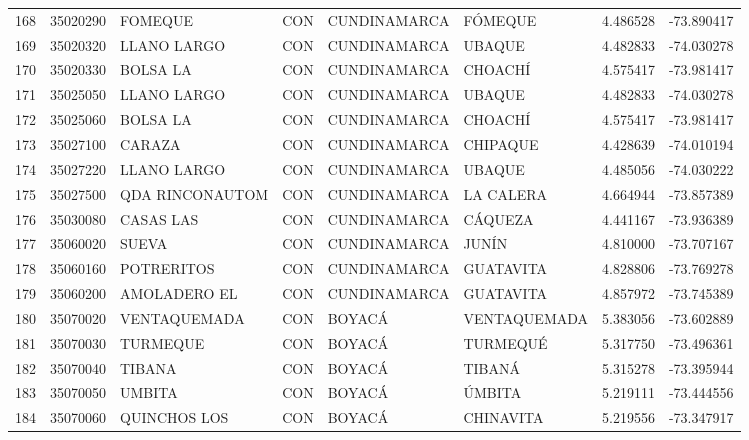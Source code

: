 \documentclass[11pt]{article}
\begin{document}
\begin{table}
\begin{tabular}{lrllllrr}
168 &  35020290 &                  FOMEQUE  &  CON &  CUNDINAMARCA &           FÓMEQUE &  4.486528 & -73.890417 \\
169 &  35020320 &              LLANO LARGO  &  CON &  CUNDINAMARCA &            UBAQUE &  4.482833 & -74.030278 \\
170 &  35020330 &                 BOLSA LA  &  CON &  CUNDINAMARCA &           CHOACHÍ &  4.575417 & -73.981417 \\
171 &  35025050 &              LLANO LARGO  &  CON &  CUNDINAMARCA &            UBAQUE &  4.482833 & -74.030278 \\
172 &  35025060 &                 BOLSA LA  &  CON &  CUNDINAMARCA &           CHOACHÍ &  4.575417 & -73.981417 \\
173 &  35027100 &                   CARAZA  &  CON &  CUNDINAMARCA &          CHIPAQUE &  4.428639 & -74.010194 \\
174 &  35027220 &              LLANO LARGO  &  CON &  CUNDINAMARCA &            UBAQUE &  4.485056 & -74.030222 \\
175 &  35027500 &           QDA RINCONAUTOM &  CON &  CUNDINAMARCA &         LA CALERA &  4.664944 & -73.857389 \\
176 &  35030080 &                CASAS LAS  &  CON &  CUNDINAMARCA &           CÁQUEZA &  4.441167 & -73.936389 \\
177 &  35060020 &                    SUEVA  &  CON &  CUNDINAMARCA &             JUNÍN &  4.810000 & -73.707167 \\
178 &  35060160 &               POTRERITOS  &  CON &  CUNDINAMARCA &         GUATAVITA &  4.828806 & -73.769278 \\
179 &  35060200 &             AMOLADERO EL  &  CON &  CUNDINAMARCA &         GUATAVITA &  4.857972 & -73.745389 \\
180 &  35070020 &          VENTAQUEMADA     &  CON &        BOYACÁ &      VENTAQUEMADA &  5.383056 & -73.602889 \\
181 &  35070030 &              TURMEQUE     &  CON &        BOYACÁ &          TURMEQUÉ &  5.317750 & -73.496361 \\
182 &  35070040 &                   TIBANA  &  CON &        BOYACÁ &            TIBANÁ &  5.315278 & -73.395944 \\
183 &  35070050 &                   UMBITA  &  CON &        BOYACÁ &            ÚMBITA &  5.219111 & -73.444556 \\
184 &  35070060 &           QUINCHOS LOS    &  CON &        BOYACÁ &         CHINAVITA &  5.219556 & -73.347917 \\

\end{tabular}
\end{table}
\end{document}

